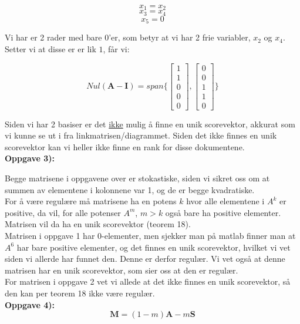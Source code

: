 \documentclass[a4paper,norsk,11pt,twoside]{article}
\begin{document}
$$
x_1 = x_2
$$
$$
x_3 = x_4
$$
$$
x_5 = 0
$$

Vi har er 2 rader med bare 0'er, som betyr at vi har 2 frie variabler, $x_2$ og $x_4$. Setter vi at disse er er lik $1$, får vi:

$$
Nul(\textbf{A} -\textbf{I}) = span\{ \begin{bmatrix}
1 \\ 1 \\ 0 \\ 0 \\ 0
\end{bmatrix},
\begin{bmatrix}
0 \\ 0 \\ 1 \\ 1 \\ 0
\end{bmatrix} \}
$$

Siden vi har 2 basiser er det \underline{ikke} mulig å finne en unik scorevektor, akkurat som vi kunne se ut i fra linkmatrisen/diagrammet. Siden det ikke finnes en unik scorevektor kan vi heller ikke finne en rank for disse dokumentene.\\



\textbf{Oppgave 3):}

Begge matrisene i oppgavene over er stokastiske, siden vi sikret oss om at summen av elementene i kolonnene var 1, og de er begge kvadratiske.\\

For å være regulære må matrisene ha en potens $k$ hvor alle elementene i $A^{k}$ er positive, da vil, for alle potenser $A^{m}$, $m>k$ også bare ha positive elementer. Matrisen vil da ha en unik scorevektor (teorem 18).\\

Matrisen i oppgave 1 har 0-elementer, men sjekker man på matlab finner man at $A^{6}$ har bare positive elementer, og det finnes en unik scorevektor, hvilket vi vet siden vi allerde har funnet den. Denne er derfor regulær. Vi vet også at denne matrisen har en unik scorevektor, som sier oss at den er regulær.\\

For matrisen i oppgave 2 vet vi allede at det ikke finnes en unik scorevektor, så den kan per teorem 18 ikke være regulær.\\

\textbf{Oppgave 4):}\\

$$
\textbf{M} = (1-m)\textbf{A} - m\textbf{S}
$$
\end{document}
